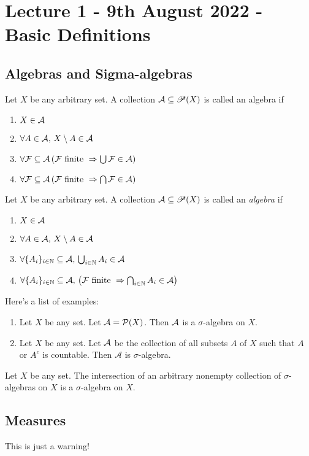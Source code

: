 \section{Lecture 1 - 9th August 2022 - Basic Definitions}
\subsection{Algebras and Sigma-algebras}
\begin{definition}[Algebra]
Let $X$ be any arbitrary set. A collection ${\cal A} \subseteq \mathscr P (X)$ is called an algebra if 
\begin{enumerate}
    \item $X\in {\cal A}$
    \item $\forall A \in {\cal A},\, X\setminus A \in {\cal A}$
    \item $\forall {\cal F} \subseteq {\cal A} \left( {\cal F} \text{ finite } \Rightarrow \bigcup {\cal F} \in {\cal A} \right)$
    \item $\forall {\cal F} \subseteq {\cal A} \left( {\cal F} \text{ finite } \Rightarrow \bigcap {\cal F} \in {\cal A} \right)$
\end{enumerate}
\end{definition}

\begin{definition}
Let $X$ be any arbitrary set. A collection ${\cal A} \subseteq \mathscr P (X)$ is called an \textit{algebra} if 
\begin{enumerate}
    \item $X\in {\cal A}$
    \item $\forall A \in {\cal A},\, X\setminus A \in {\cal A}$
    \item $\forall \{ A_i \}_{i\in\mathbb N} \subseteq \mathcal{A}, \,  \bigcup_{i\in \mathbb N} A_i  \in {\cal A} $
    \item $\forall \{ A_i \}_{i\in\mathbb N} \subseteq \mathcal{A},\, \left( {\cal F} \text{ finite } \Rightarrow \bigcap_{i\in\mathbb N} A_i\in {\cal A} \right)$
\end{enumerate}
\end{definition}

\begin{example} Here's a list of examples:
\begin{enumerate}
    \item Let $X$ be any set. Let ${\cal A} ={\cal P} (X)$. Then ${\cal A}$ is a $\sigma$-algebra on $X$.
    \item Let $X$ be any set. Let ${\cal A}$ be the collection of all subsets $A$ of $X$ such that $A$ or $A^c$ is countable. Then $\mathcal{A}$ is $\sigma$-algebra.
\end{enumerate}
\end{example}

\begin{proposition}
Let $X$ be any set. The intersection of an arbitrary nonempty collection of $\sigma$-algebras on $X$ is a $\sigma$-algebra on $X$.
\end{proposition}


\subsection{Measures}
\begin{example}
\warning This is just a warning!
\end{example}
